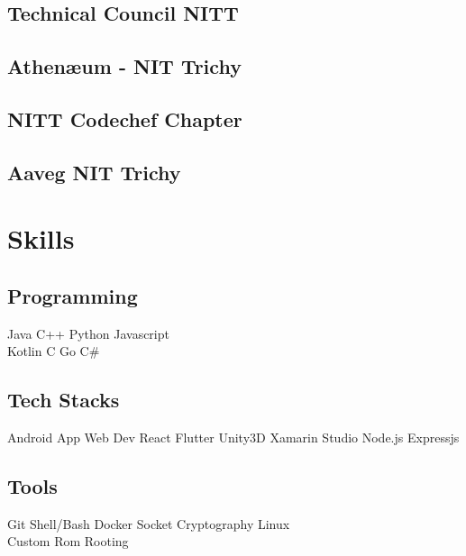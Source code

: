 \documentclass[]{deedy-resume-openfont}
\begin{document}
\begin{minipage}[t]{0.3\textwidth}
\subsection{Technical Council NITT}
\sectionsep

\subsection{Athenæum - NIT Trichy}
\sectionsep

\subsection{NITT Codechef Chapter}

\sectionsep
\subsection{Aaveg NIT Trichy}


\section{Skills}

\subsection{Programming}
Java \textbullet{}   C++ \textbullet{} Python \textbullet{} Javascript \\
Kotlin \textbullet{} C \textbullet{} Go \textbullet{} C\# \\ 
\subsection{Tech Stacks}
Android App \textbullet{}   Web Dev \textbullet{} React  \textbullet{} Flutter \textbullet{}   Unity3D \textbullet{} Xamarin Studio \textbullet{} Node.js \textbullet{} Expressjs \\ 
\subsection{Tools}
Git \textbullet{}   Shell/Bash \textbullet{} Docker \textbullet{} Socket \textbullet{} Cryptography \textbullet{} Linux \\
Custom Rom \textbullet{} Rooting \\ 
\sectionsep

%
%

\end{minipage} 
\end{document}
